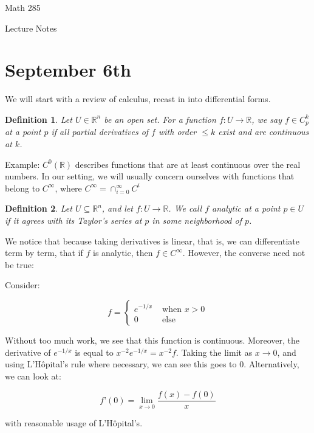 \documentclass[10pt]{article}
\newtheorem{definition}{Definition}[section]
\begin{document}
\begin{Large}
\centerline{Math 285}
\centerline{Lecture Notes}  %
\centerline{\bf }       %
\centerline{}      %
\end{Large}

\section{September 6th}

We will start with a review of calculus, recast in into differential forms.

\begin{definition}
Let $U \in \mathbb{R}^n$ be an open set. For a function $f: U \to \mathbb{R}$, we say $f \in C^k_p$ at a point $p$ if all partial derivatives of $f$ with order $\leq k$ exist and are continuous at $k$.
\end{definition}

Example: $C^0(\mathbb{R})$ describes functions that are at least continuous over the real numbers.
In our setting, we will usually concern ourselves with functions that belong to $C^{\infty}$, where $C^\infty = \cap_{i=0}^\infty C^{i}$

\begin{definition}
Let $U \subseteq \mathbb{R}^n$, and let $f: U \to \mathbb{R}$. We call $f$ analytic at a point $p \in U$ if it agrees with its Taylor’s series at $p$ in some neighborhood of $p$.
\end{definition}

We notice that because taking derivatives is linear, that is, we can differentiate term by term, that if $f$ is analytic, then $f \in C^\infty$. However, the converse need not be true:

Consider:

$$ f = \begin{cases} e^{-1/x} & \text{ when } x > 0  \\ 0 & \text{ else } \end{cases} $$

Without too much work, we see that this function is continuous. Moreover, the derivative of $e^{-1/x}$ is equal to $x^{-2}e^{-1/x} = x^{-2}f$. Taking the limit as $x \to 0$, and using L’H\^opital’s rule where necessary, we can see this goes to 0. Alternatively, we can look at:

$$ f’(0) = \lim_{x \to 0} \frac{f(x) - f(0)}{x}$$

with reasonable usage of L’H\^opital’s.
\end{document}
